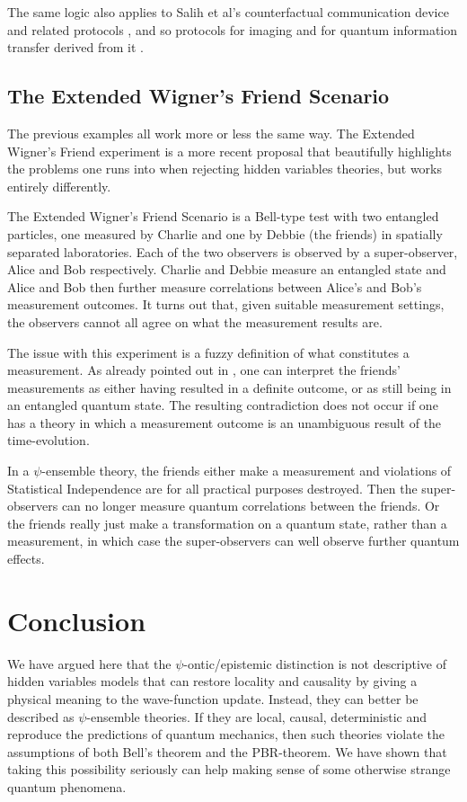\documentclass[superscriptaddress,floatfix,nofootinbib,12pt]{revtex4-2}
\begin{document}
The same logic also applies to Salih et al's counterfactual communication device and related protocols \cite{Salih2013Protocol,Salih2018Laws,Hance2021Quantum}, and so protocols for imaging \cite{Hance2021CFGI} and for quantum information transfer derived from it \cite{Salih2020DetTele,Salih2021EFQubit}.

\subsection{The Extended Wigner's Friend Scenario}

The previous examples all work more or less the same way. The Extended Wigner's Friend experiment \cite{Frauchiger2018Wigner} is a more recent proposal that beautifully highlights the problems one runs into when rejecting hidden variables theories, but works entirely differently. 

The Extended Wigner's Friend Scenario is a Bell-type test with two entangled particles, one measured by Charlie and one by Debbie (the friends) in spatially separated laboratories. Each of the two observers is observed by a super-observer, Alice and Bob respectively. Charlie and Debbie measure an entangled state and Alice and Bob then further measure correlations between Alice's and Bob's measurement outcomes. It turns out that, given suitable measurement settings, the observers cannot all agree on what the measurement results are. 

The issue with this experiment is a fuzzy definition of what constitutes a measurement. As already pointed out in \cite{relano2018decoherence,zukowski2021physics}, one can interpret the friends' measurements as either having resulted in a definite outcome, or as still being in an entangled quantum state. The resulting contradiction does not occur if one has a theory in which a measurement outcome is an unambiguous result of the time-evolution. 

In a $\psi$-ensemble theory, the friends either make a measurement and violations of Statistical Independence are for all practical purposes destroyed. Then the super-observers can no longer measure quantum correlations between the friends. Or the friends really just make a transformation on a quantum state, rather than a measurement, in which case the super-observers can well observe further quantum effects. 

\section{Conclusion}
We have argued here that the $\psi$-ontic/epistemic distinction is not descriptive of hidden variables models that can restore locality and causality by giving a physical meaning to the wave-function update. Instead, they can better be described as $\psi$-ensemble theories. If they are local, causal, deterministic and reproduce the predictions of quantum mechanics, then such theories violate the assumptions of both Bell's theorem and the {\sc PBR}-theorem. We have shown that taking this possibility seriously can help making sense of some otherwise strange quantum phenomena. 
\end{document}
